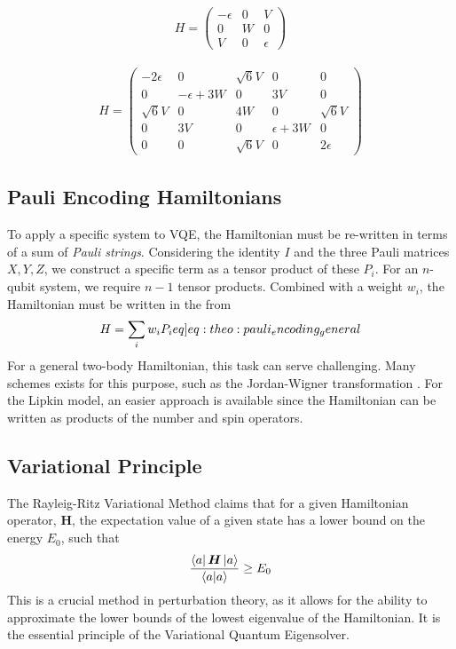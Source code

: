 \begin{align}
    H = \begin{pmatrix}
        -\epsilon & 0 & V \\
        0 & W & 0 \\
        V & 0 & \epsilon
    \end{pmatrix}
\end{align}

\begin{align}
    H = \begin{pmatrix}
        -2\epsilon & 0  & \sqrt{6}V &0 &0 \\
        0 & -\epsilon + 3W & 0 & 3V & 0 \\
        \sqrt{6}V & 0 & 4W & 0 & \sqrt{6}V \\
        0 & 3V & 0 & \epsilon + 3W & 0 \\
        0 & 0 & \sqrt{6}V & 0 & 2\epsilon
    \end{pmatrix}
\end{align}

\subsection{Pauli Encoding Hamiltonians}
To apply a specific system to VQE, the Hamiltonian must be re-written in terms of a sum of \textit{Pauli strings}. Considering the identity $I$ and the three Pauli matrices $X, Y, Z$, we construct a specific term as a tensor product of these $P_i$. For an $n$-qubit system, we require $n-1$ tensor products. Combined with a weight $w_i$, the Hamiltonian must be written in the from
\begin{align}
    H = \sum_i w_i P_i \label[eq]{eq:theo:pauli_encoding_general}
\end{align}
For a general two-body Hamiltonian, this task can serve challenging. Many schemes exists for this purpose, such as the Jordan-Wigner transformation \citep{steudtnerMethodsSimulateFermions2019}. For the Lipkin model, an easier approach is available since the Hamiltonian can be written as products of the number and spin operators.

\subsection{Variational Principle}
The Rayleig-Ritz Variational Method claims that for a given Hamiltonian operator, \textbf{H}, the expectation value of a given state has a lower bound on the energy $E_0$, such that
\begin{equation}
    \frac{\bra{a}\boldsymbol{H}\ket{a}}{\braket{a}} \geq E_0
\end{equation}
This is a crucial method in perturbation theory, as it allows for the ability to approximate the lower bounds of the lowest eigenvalue of the Hamiltonian. It is the essential principle of the Variational Quantum Eigensolver. 

